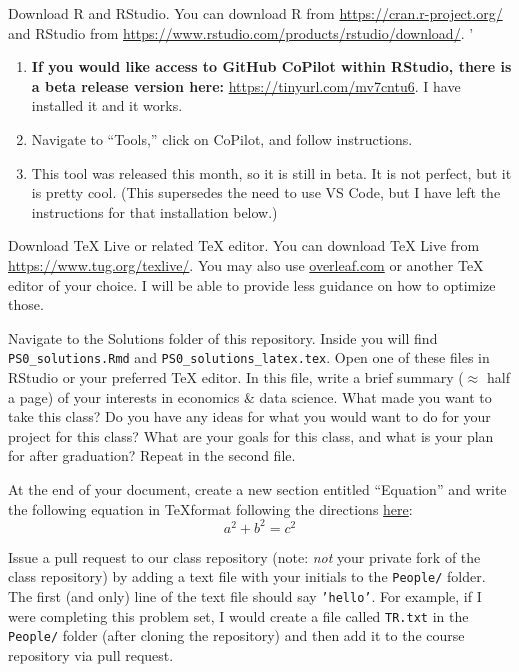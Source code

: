 \documentclass[12pt,english]{exam}
\begin{document}
\begin{questions}
\question Download R and RStudio. You can download R from \url{https://cran.r-project.org/} and RStudio from \url{https://www.rstudio.com/products/rstudio/download/}. '

\begin{enumerate}
  \item \textbf{If you would like access to GitHub CoPilot within RStudio, there is a beta release version here:} \url{https://tinyurl.com/mv7cntu6}. I have installed it and it works. 
  \item Navigate to ``Tools,'' click on CoPilot, and follow instructions. 
  \item This tool was released this month, so it is still in beta. It is not perfect, but it is pretty cool. (This supersedes the need to use VS Code, but I have left the instructions for that installation below.)
\end{enumerate}

\question Download TeX Live or related TeX editor. You can download TeX Live from \url{https://www.tug.org/texlive/}. You may also use \url{overleaf.com} or another TeX editor of your choice. I will be able to provide less guidance on how to optimize those.

\question Navigate to the Solutions folder of this repository. Inside you will find \texttt{PS0\_solutions.Rmd} and \texttt{PS0\_solutions\_latex.tex}. Open one of these files in RStudio or your preferred TeX editor. In this file, write a brief summary ($\approx$ half a page) of your interests in economics \& data science. What made you want to take this class? Do you have any ideas for what you would want to do for your project for this class? What are your goals for this class, and what is your plan for after graduation? Repeat in the second file. 

\question At the end of your document, create a new section entitled ``Equation'' and write the following equation in \TeX format following the directions \href{https://www.overleaf.com/learn/latex/mathematical_expressions}{here}:
\begin{equation}
	a^{2} + b^{2} = c^{2}
\end{equation}

\question Issue a pull request to our class repository (note: \emph{not} your private fork of the class repository) by adding a text file with your initials to the \texttt{People/} folder. The first (and only) line of the text file should say \texttt{'hello'}. For example, if I were completing this problem set, I would create a file called \texttt{TR.txt} in the \texttt{People/} folder (after cloning the repository) and then add it to the course repository via pull request.

\end{questions}
\end{document}
